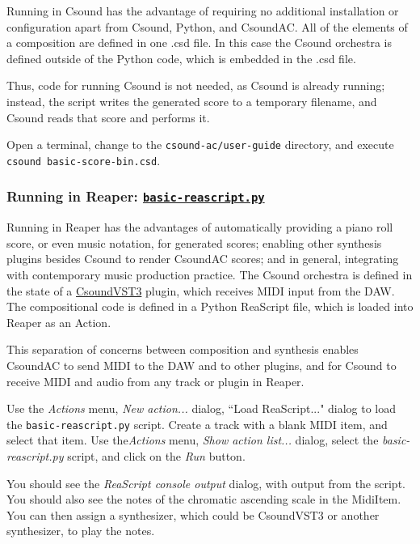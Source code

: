 \documentclass[letterpaper,10pt,DIV=12,parskip=half]{scrartcl}
\begin{document}
Running in Csound has the advantage of requiring no additional installation or configuration apart from Csound, Python, and CsoundAC. All of the elements of a composition are defined in one .csd file. In this case the Csound orchestra is defined outside of the Python code, which is embedded in the .csd file.

Thus, code for running Csound is not needed, as Csound is already running; instead, the script writes the generated score to a temporary filename, and Csound reads that score and performs it. 

Open a terminal, change to the \lstinline|csound-ac/user-guide| directory, and execute \lstinline|csound basic-score-bin.csd|.

\subsubsection{Running in Reaper: \href{https://github.com/gogins/csound-ac/blob/master/user-guide/basic-reascript.py}{\lstinline|basic-reascript.py|}}

Running in Reaper has the advantages of automatically providing a piano roll score, or even music notation, for generated scores; enabling other synthesis plugins besides Csound to render CsoundAC scores; and in general, integrating with contemporary music production practice. The Csound orchestra is defined in the state of a \href{https://github.com/gogins/csound-vst3}{CsoundVST3} plugin, which receives MIDI input from the DAW. The compositional code is defined in a Python ReaScript file, which is loaded into Reaper as an Action. 

This separation of concerns between composition and synthesis enables CsoundAC to send MIDI to the DAW and to other plugins, and for Csound to receive MIDI and audio from any track or plugin in Reaper.

Use the \emph{Actions} menu, \emph{New action...} dialog, ``Load ReaScript..." dialog to load the \lstinline|basic-reascript.py| script. Create a track with a blank MIDI item, and select that item. Use the\emph{Actions} menu, \emph{Show action list...} dialog, select the \emph{basic-reascript.py} script, and click on the \emph{Run} button. 

You should see the \emph{ReaScript console output} dialog, with output from the script. You should also see the notes of the chromatic ascending scale in the MidiItem. You can then assign a synthesizer, which could be CsoundVST3 or another synthesizer, to play the notes.
\end{document}
